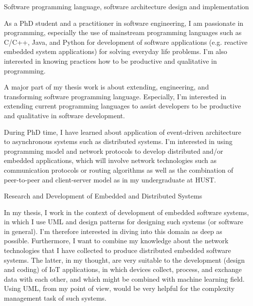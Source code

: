 \begin{cventries}

\cvinterest
{Software programming language, software architecture design and implementation}
{
	\begin{cvitems}
		\item{As a PhD student and a practitioner in software engineering, I am passionate in programming, especially the use of mainstream programming languages such as C/C++, Java, and Python for development of software applications (e.g. reactive embedded system applications) for solving everyday life problems. I'm also interested in knowing practices how to be productive and qualitative in programming.}
		\item{A major part of my thesis work is about extending, engineering, and transforming software programming language. Especially, I'm interested in extending current programming languages to assist developers to be productive and qualitative in software development.}
		\item{During PhD time, I have learned about application of event-driven architecture to asynchronous systems such as distributed systems. I'm interested in using programming model and network protocols to develop distributed and/or embedded applications, which will involve network technologies such as communication protocols or routing algorithms as well as the combination of peer-to-peer and client-server model as in my undergraduate at HUST.}
	\end{cvitems}
}


\cvinterest
{Research and Development of Embedded and Distributed Systems}
{\begin{cvitems}
		\item{In my thesis, I work in the context of development of embedded software systems, in which I use UML and design patterns for designing such systems (or software in general). I'm therefore interested in diving into this domain as deep as possible. Furthermore, I want to combine my knowledge about the network technologies that I have collected to produce distributed embedded software systems. The latter, in my thought, are very suitable to the development (design and coding) of IoT applications, in which devices collect, process, and exchange data with each other, and which might be combined with machine learning field. Using UML, from my point of view, would be very helpful for the complexity management task of such systems.}
\end{cvitems}}


\end{cventries}
